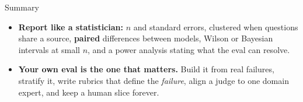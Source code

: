 \begin{frame}[allowframebreaks]{Summary}
\begin{itemize}
    \item[\textcolor{red}{$\blacktriangleright$}] \textbf{Report like a statistician:} $n$ and standard errors, clustered when questions share a source, \textbf{paired} differences between models, Wilson or Bayesian intervals at small $n$, and a power analysis stating what the eval can resolve.
    \item[\textcolor{red}{$\blacktriangleright$}] \textbf{Your own eval is the one that matters.} Build it from real failures, stratify it, write rubrics that define the \textit{failure}, align a judge to one domain expert, and keep a human slice forever.
  \end{itemize}
\end{frame}
